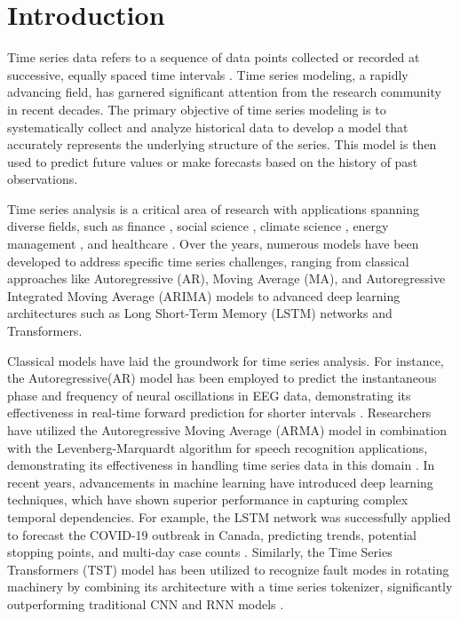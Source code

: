 \documentclass[sn-mathphys-num]{sn-jnl}
\theoremstyle{thmstyleone}%
\theoremstyle{thmstyletwo}%
\theoremstyle{thmstylethree}%
\begin{document}

\maketitle

\section{Introduction}\label{sec1}
Time series data refers to a sequence of data points collected or recorded at successive, equally spaced time intervals \cite{adhikari2013introductory}. Time series modeling, a rapidly advancing field, has garnered significant attention from the research community in recent decades. The primary objective of time series modeling is to systematically collect and analyze historical data to develop a model that accurately represents the underlying structure of the series. This model is then used to predict future values or make forecasts based on the history of past observations. 

Time series analysis is a critical area of research with applications spanning diverse fields, such as finance \cite{kim2011time}, social science \cite{box2014time}, climate science \cite{mudelsee2010climate}, energy management \cite{chou2018forecasting}, and healthcare \cite{gao2020time}. Over the years, numerous models have been developed to address specific time series challenges, ranging from classical approaches like Autoregressive (AR), Moving Average (MA), and Autoregressive Integrated Moving Average (ARIMA) models to advanced deep learning architectures such as Long Short-Term Memory (LSTM) networks and Transformers.

Classical models have laid the groundwork for time series analysis. For instance, the Autoregressive(AR) model has been employed to predict the instantaneous phase and frequency of neural oscillations in EEG data, demonstrating its effectiveness in real-time forward prediction for shorter intervals \cite{shakeel2020time}. Researchers have utilized the Autoregressive Moving Average (ARMA) model in combination with the Levenberg-Marquardt algorithm for speech recognition applications, demonstrating its effectiveness in handling time series data in this domain \cite{jafari2024speech}. In recent years, advancements in machine learning have introduced deep learning techniques, which have shown superior performance in capturing complex temporal dependencies. For example, the LSTM network was successfully applied to forecast the COVID-19 outbreak in Canada, predicting trends, potential stopping points, and multi-day case counts \cite{chimmula2020time}. Similarly, the Time Series Transformers (TST) model has been utilized to recognize fault modes in rotating machinery by combining its architecture with a time series tokenizer, significantly outperforming traditional CNN and RNN models \cite{jin2022time}. 
\end{document}
